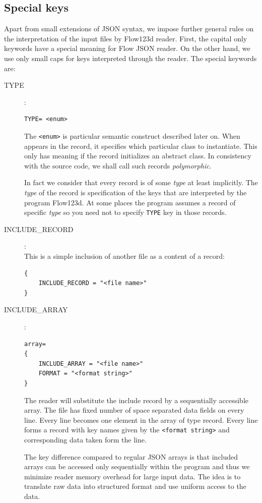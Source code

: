 \documentclass[12pt,a4paper]{report}
\begin{document}
\subsection{Special keys}
Apart from small extensions of JSON syntax, we impose further general rules on the interpretation of the input files by Flow123d reader.
First, the capital only keywords  
have a special meaning for Flow JSON reader. On the other hand, we use only small caps for keys interpreted through the reader.
The special keywords are:
\begin{description}

\item[TYPE]:\\ 
\begin{verbatim}
TYPE= <enum>
\end{verbatim}
The \verb'<enum>' is particular semantic construct described later on. 
When appears in the record, it specifies which particular class to instantiate. This only has meaning if the record initializes
an abstract class. In consistency with the source code, we shall call such records {\it polymorphic}. 


In fact we consider
that every record is of some {\it type} at least implicitly. The {\it type} of the record is specification of the keys that are
interpreted by the program Flow123d. At some places the program assumes a record of specific {\it type} so you need not to specify 
\verb'TYPE' key in those records.

\item[INCLUDE\_RECORD]:\\
This is a simple inclusion of another file as a content of a record:
\begin{verbatim}
{
	INCLUDE_RECORD = "<file name>"
}
\end{verbatim}

\item[INCLUDE\_ARRAY]:\\
\begin{verbatim}
array=
{
	INCLUDE_ARRAY = "<file name>"
	FORMAT = "<format string>"
}	
\end{verbatim}
The reader will substitute the include record by a sequentially accessible array. The file has fixed number of 
space separated data fields on every line. Every line becomes one element in the array of type record. Every line forms a 
record with key names given by the \verb'<format string>' 
and corresponding data taken form the line.

The key difference compared to regular JSON arrays is that included arrays can be accessed only sequentially 
within the program and thus we minimize reader memory overhead for large input data. The idea is to translate raw data into structured
format and use uniform access to the data.


\end{description}
\end{document}

